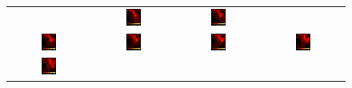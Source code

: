 \begin{figure}[htp]
\begin{tabular}{cccc}
 &  \includegraphics[width=0.2\textwidth]{Figures/sph_bates_starcluster_06.jpg}
 &  \includegraphics[width=0.2\textwidth]{Figures/sph_bates_starcluster_07.jpg} 
 \\
	\includegraphics[width=0.2\textwidth]{Figures/sph_bates_starcluster_08.jpg} 
&   \includegraphics[width=0.2\textwidth]{Figures/sph_bates_starcluster_09.jpg}  
&   \includegraphics[width=0.2\textwidth]{Figures/sph_bates_starcluster_10.jpg}
&   \includegraphics[width=0.2\textwidth]{Figures/sph_bates_starcluster_11.jpg} 
\\
	\includegraphics[width=0.2\textwidth]{Figures/sph_bates_starcluster_12.jpg} 

\end{tabular}
\end{figure}
